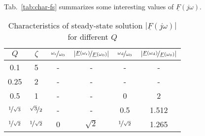 \documentclass{article}[11pt]
\begin{document}
Tab.~\ref{tab:char-fs} summarizes some interesting values of
$\underline{F}(j\omega)$.
\begin{table}[H]
\centering
\caption{Characteristics of steady-state solution 
  $\left|\underline{F}(j\omega)\right|$ for different $Q$}
\begin{tabular}{cccccc}
\toprule
$Q$                      & $\zeta$                   & $\nicefrac{\omega_{\mathrm{r}}}{\omega_0}$ & $\left|\nicefrac{\underline{F}(\omega_{\mathrm{r}})}{\underline{F}(\omega_{\mathrm{0}})}\right|$ & $\nicefrac{\omega_{\mathrm{d}}}{\omega_0}$ & $\left|\nicefrac{\underline{F}(\omega_{\mathrm{d}})}{\underline{F}(\omega_{\mathrm{0}})}\right|$ \\ \midrule
0.1                      & 5                         & -                                          & -                                                                                                & -                                          & -                                                                                                \\
0.25                     & 2                         & -                                          & -                                                                                                & -                                          & -                                                                                                \\ 
0.5                      & 1                         & -                                          & -                                                                                                & 0                                          & 2                                                                                                \\
$\nicefrac{1}{\sqrt{3}}$ & $\nicefrac{\sqrt{3}}{2}$  & -                                          & -                                                                                                & 0.5                                        & 1.512                                                                                            \\ 
$\nicefrac{1}{\sqrt{2}}$ & $\nicefrac{1}{\sqrt{2}}$  & 0                                          & $\sqrt{2}$                                                                                       & $\nicefrac{1}{\sqrt{2}}$                   & 1.265                                                                                            \\

\end{tabular}
\end{table}
\end{document}
